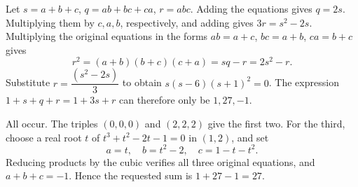 Let $s=a+b+c$, $q=ab+bc+ca$, $r=abc$. Adding the equations gives $q=2s$. Multiplying them by $c,a,b$, respectively, and adding gives $3r=s^2-2s$. Multiplying the original equations in the forms $ab=a+c$, $bc=a+b$, $ca=b+c$ gives
\[
r^2=(a+b)(b+c)(c+a)=sq-r=2s^2-r.
\]
Substitute $r=\dfrac{(s^2-2s)}{3}$ to obtain $s(s-6)(s+1)^2=0$. The expression $1+s+q+r=1+3s+r$ can therefore only be $1,27,-1$.

All occur. The triples $(0,0,0)$ and $(2,2,2)$ give the first two. For the third, choose a real root $t$ of $t^3+t^2-2t-1=0$ in $(1,2)$, and set
\[
a=t,\quad b=t^2-2,\quad c=1-t-t^2.
\]
Reducing products by the cubic verifies all three original equations, and $a+b+c=-1$. Hence the requested sum is $1+27-1=\boxed{27}$.
